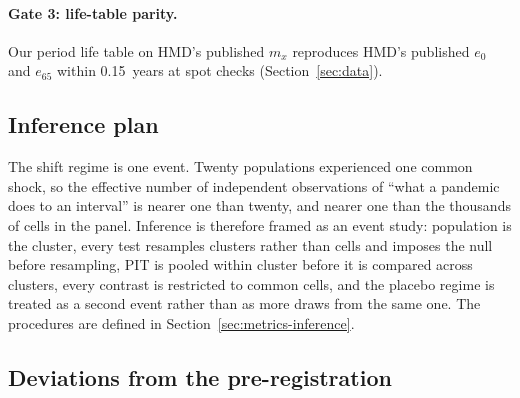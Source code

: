 \paragraph{Gate 3: life-table parity.} Our period life table on HMD's
published $m_x$ reproduces HMD's published $e_0$ and $e_{65}$ within
0.15~years at spot checks (Section~\ref{sec:data}).

\subsection{Inference plan}

The shift regime is one event. Twenty populations experienced one common
shock, so the effective number of independent observations of ``what a
pandemic does to an interval'' is nearer one than twenty, and nearer one
than the thousands of cells in the panel. Inference is therefore framed as
an event study: population is the cluster, every test resamples clusters
rather than cells and imposes the null before resampling, PIT is pooled
within cluster before it is compared across clusters, every contrast is
restricted to common cells, and the placebo regime is treated as a second
event rather than as more draws from the same one. The procedures are
defined in Section~\ref{sec:metrics-inference}.

\subsection{Deviations from the pre-registration}
\label{sec:design-deviations}

